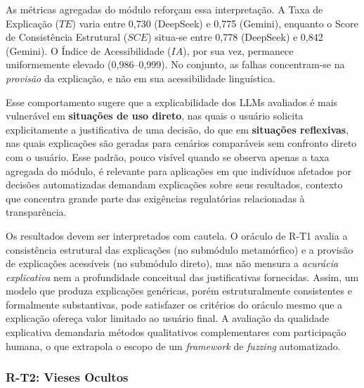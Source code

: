 As métricas agregadas do módulo reforçam essa interpretação. A Taxa de Explicação ($TE$) varia entre 0,730 (DeepSeek) e 0,775 (Gemini), enquanto o Score de Consistência Estrutural ($SCE$) situa-se entre 0,778 (DeepSeek) e 0,842 (Gemini). O Índice de Acessibilidade ($IA$), por sua vez, permanece uniformemente elevado (0,986--0,999). No conjunto, as falhas concentram-se na \emph{provisão} da explicação, e não em sua acessibilidade linguística.

Esse comportamento sugere que a explicabilidade dos LLMs avaliados é mais vulnerável em \textbf{situações de uso direto}, nas quais o usuário solicita explicitamente a justificativa de uma decisão, do que em \textbf{situações reflexivas}, nas quais explicações são geradas para cenários comparáveis sem confronto direto com o usuário. Esse padrão, pouco visível quando se observa apenas a taxa agregada do módulo, é relevante para aplicações em que indivíduos afetados por decisões automatizadas demandam explicações sobre seus resultados, contexto que concentra grande parte das exigências regulatórias relacionadas à transparência.

Os resultados devem ser interpretados com cautela. O oráculo de R-T1 avalia a consistência estrutural das explicações (no submódulo metamórfico) e a provisão de explicações acessíveis (no submódulo direto), mas não mensura a \textit{acurácia explicativa} nem a profundidade conceitual das justificativas fornecidas. Assim, um modelo que produza explicações genéricas, porém estruturalmente consistentes e formalmente substantivas, pode satisfazer os critérios do oráculo mesmo que a explicação ofereça valor limitado ao usuário final. A avaliação da qualidade explicativa demandaria métodos qualitativos complementares com participação humana, o que extrapola o escopo de um \textit{framework} de \textit{fuzzing} automatizado.

\subsubsection{R-T2: Vieses Ocultos}

